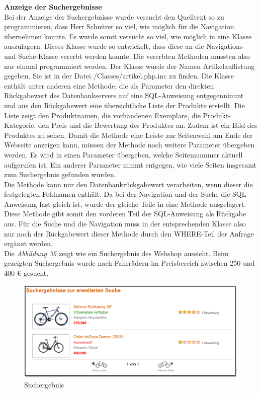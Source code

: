 \textbf{Anzeige der Suchergebnisse}\\
Bei der Anzeige der Suchergebnisse wurde versucht den Quelltext so zu programmieren, dass Herr Schnürer so viel, wie möglich für die Navigation übernehmen konnte. Es wurde somit versucht so viel, wie möglich in eine Klasse auszulagern. Dieses Klasse wurde so entwickelt, dass diese an die Navigations- und Suche-Klasse vererbt werden konnte. Die vererbten Methoden mussten also nur einmal programmiert werden. Der Klasse wurde der Namen \glqq Artikelauflistung\grqq{} gegeben. Sie ist in der Datei \glqq /Classes/artikel.php.inc\grqq{} zu finden. Die Klasse enthält unter anderen eine Methode, die als Parameter den direkten Rückgabewert des Datenbankservers auf eine SQL-Anweisung entgegennimmt und aus den Rückgabewert eine übersichtliche Liste der Produkte erstellt. Die Liste zeigt den Produktnamen, die vorhandenen Exemplare, die Produkt-Kategorie, den Preis und die Bewertung des Produktes an. Zudem ist ein Bild des Produktes zu sehen. Damit die Methode eine Leiste zur Seitenwahl am Ende der Webseite anzeigen kann, müssen der Methode noch weitere Parameter übergeben werden. Es wird in einen Parameter übergeben, welche Seitennummer aktuell aufgerufen ist. Ein anderer Parameter nimmt entgegen, wie viele Seiten insgesamt zum Suchergebnis gefunden wurden. \\
Die Methode kann nur den Datenbankrückgabewert verarbeiten, wenn dieser die festgelegten Feldnamen enthält. Da bei der Navigation und der Suche die SQL-Anweisung fast gleich ist, wurde der gleiche Teile in eine Methode ausgelagert. Diese Methode gibt somit den vorderen Teil der SQL-Anweisung als Rückgabe aus. Für die Suche und die Navigation muss in der entsprechenden Klasse also nur noch der Rückgabewert dieser Methode durch den \glqq WHERE-Teil \grqq{} der Anfrage ergänzt werden.\\
Die \textit{Abbildung 35} zeigt wie ein Suchergebnis des Webshop aussieht. Beim gezeigten Suchergebnis wurde nach Fahrrädern im Preisbereich zwischen 250 und 400 € gesucht.

\begin{figure}[H]
	\begin{center}
			\includegraphics[width=130mm]{Bilder/suchergebnis.png}
	\end{center}
	\caption{Suchergebnis}
\end{figure}

